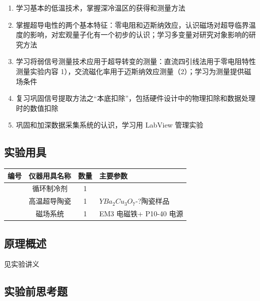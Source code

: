 \documentclass{ctexart}
\theoremstyle{ansstyle}
\newcounter{instruCounter}
\newcommand{\instrument}[3]{%
	\stepcounter{instruCounter}\theinstruCounter &%
	#1 &%
	#2 &%
	#3 \\
	\hline
}
\begin{document}
	\begin{enumerate}
		\item 学习基本的低温技术，掌握深冷温区的获得和测量方法
		\item 掌握超导电性的两个基本特征：零电阻和迈斯纳效应，认识磁场对超导临界温度的影响，对宏观量子化有一个初步的认识；学习多变量对研究对象影响的研究方法
		\item 学习将弱信号测量技术应用于超导转变的测量：直流四引线法用于零电阻特性测量实验内容 1），交流磁化率用于迈斯纳效应测量（2）；学习为测量提供磁场条件
		\item 复习巩固信号提取方法之“本底扣除”，包括硬件设计中的物理扣除和数据处理时的数值扣除
		\item 巩固和加深数据采集系统的认识，学习用 LabView 管理实验
	\end{enumerate}
	
	\subsection{实验用具}
	\begin{table}[H]
		\begin{center}
			\begin{tabular}{|c|c|c|m{12cm}|}
				\hline
				编号 & 仪器用具名称 & 数量 & 主要参数 \\
				\hline
				\instrument{循环制冷剂}{1}{} %
				\instrument{高温超导陶瓷}{1}{$YBa_2Cu_3O_7$-?陶瓷样品}
				\instrument{磁场系统}{1}{EM3 电磁铁+ P10-40 电源}
			\end{tabular}
		\end{center}
	\end{table}
	
	
	
	\subsection{原理概述}
	见实验讲义
	
	\subsection{实验前思考题}
\end{document}
